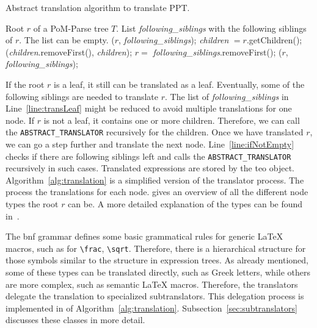 \documentclass[a4paper,11pt]{article}
\theoremstyle{defTheoStyle}
\theoremstyle{defExampStyle}
\begin{document}
	\begin{algorithm}[t]
		\caption{Abstract translation algorithm to translate PPT.}\label{alg:translation}
		\begin{algorithmic}[1]
			\Require Root $r$ of a PoM-Parse tree $T$. List \textit{following\_siblings} with the following siblings of $r$. The list can be empty.
			($r$, \textit{following\_siblings});\label{line:transLeaf}
			\Else
			\State \textit{children} $ = r$.getChildren(); 
			(\textit{children}.removeFirst(), \textit{children});\label{line:transSeq}
			\EndIf
			\label{line:ifNotEmpty}
			\State $r =$ \textit{following\_siblings}.removeFirst();
			($r$, \textit{following\_siblings});
			\EndIf
			\EndProcedure
		\end{algorithmic}
	\end{algorithm}
	
	If the root $r$ is a leaf, it still can be translated as a leaf. Eventually, some of the following siblings are needed to translate $r$. The list of \textit{following\_siblings} in Line~\ref{line:transLeaf} might be reduced to avoid multiple translations for one node. If $r$ is not a leaf, it contains one or more children. Therefore, we can call the {\footnotesize \verb|ABSTRACT_TRANSLATOR|} recursively for the children. Once we have translated $r$, we can go a step further and translate the next node. Line~\ref{line:ifNotEmpty} checks if there are following siblings left and calls the {\footnotesize \verb|ABSTRACT_TRANSLATOR|} recursively in such cases. Translated expressions are stored by the \gls*{teo} object. Algorithm~\ref{alg:translation} is a simplified version of the translator process. The  process the translations for each node.  gives an overview of all the different node types the root $r$ can be. A more detailed explanation of the types can be found in~\parencite{POM-Tagger}.
	
	The \gls*{bnf} grammar defines some basic grammatical rules for generic \LaTeX{} macros, such as for \verb|\frac|, \verb|\sqrt|. Therefore, there is a hierarchical structure for those symbols similar to the structure in expression trees. As already mentioned, some of these types can be translated directly, such as Greek letters, while others are more complex, such as semantic \LaTeX{} macros. Therefore, the translators delegate the translation to specialized subtranslators. This delegation process is implemented in  of Algorithm~\ref{alg:translation}.  
	Subsection~\ref{sec:subtranslators} discusses these classes in more detail.
	
\end{document}
